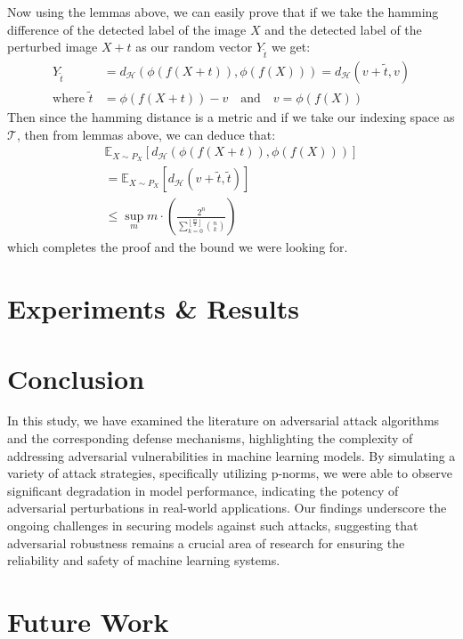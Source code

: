 \documentclass{article}
\theoremstyle{plain}
\theoremstyle{definition}
\theoremstyle{remark}
\begin{document}
Now using the lemmas above, we can easily prove that if we take the hamming difference of the detected label of the image $X$ and the detected label of the perturbed image $X+t$ as our random vector $Y_\tilde{t}$ we get:
\begin{align*}
    Y_{\tilde{t}} &= d_\mathcal{H}(\phi(f(X + t)), \phi(f(X))) = d_\mathcal{H}(v + \tilde{t}, v) \\
    \text{where } \tilde{t} &= \phi(f(X + t)) - v \quad \text{and} \quad v = \phi(f(X))
\end{align*}
Then since the hamming distance is a metric and if we take our indexing space as $\mathcal{T}$, then from lemmas above, we can deduce that:
\begin{align*}
    \mathbb{E}_{X \sim P_X} \left[ d_\mathcal{H}(\phi(f(X + t)), \phi(f(X))) \right] \\
    = \mathbb{E}_{X \sim P_X} \left[ d_\mathcal{H}(v + \tilde{t}, \tilde{t}) \right] \\
    \leq \sup_{m} m \cdot \left( \frac{2^n}{ \sum_{k=0}^{\left\lfloor \frac{m}{2} \right\rfloor} \binom{n}{k}} \right)
\end{align*}
 which completes the proof and the bound we were looking for.

\section{Experiments \& Results}

\section*{Conclusion}

In this study, we have examined the literature on adversarial attack algorithms and the corresponding defense mechanisms, highlighting the complexity of addressing adversarial vulnerabilities in machine learning models. By simulating a variety of attack strategies, specifically utilizing p-norms, we were able to observe significant degradation in model performance, indicating the potency of adversarial perturbations in real-world applications. Our findings underscore the ongoing challenges in securing models against such attacks, suggesting that adversarial robustness remains a crucial area of research for ensuring the reliability and safety of machine learning systems.

\section*{Future Work}
\end{document}
